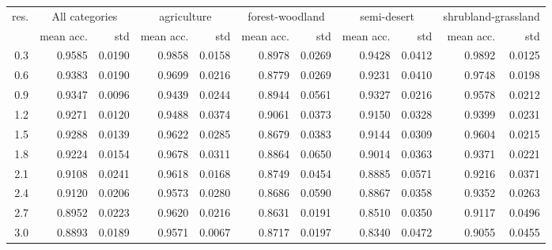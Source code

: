 \begin{tabular}{rrrrrrrrrrr}
\toprule
res. & \multicolumn{2}{c}{All categories} & \multicolumn{2}{c}{agriculture} & \multicolumn{2}{c}{forest-woodland} & \multicolumn{2}{c}{semi-desert} & \multicolumn{2}{c}{shrubland-grassland} \\
           &     mean acc. &    std &                 mean acc. &    std &                     mean acc. &    std &                 mean acc. &    std &                         mean acc. &    std \\
\midrule
       0.3 &   0.9585 & 0.0190 &               0.9858 & 0.0158 &                   0.8978 & 0.0269 &               0.9428 & 0.0412 &                       0.9892 & 0.0125 \\
       0.6 &   0.9383 & 0.0190 &               0.9699 & 0.0216 &                   0.8779 & 0.0269 &               0.9231 & 0.0410 &                       0.9748 & 0.0198 \\
       0.9 &   0.9347 & 0.0096 &               0.9439 & 0.0244 &                   0.8944 & 0.0561 &               0.9327 & 0.0216 &                       0.9578 & 0.0212 \\
       1.2 &   0.9271 & 0.0120 &               0.9488 & 0.0374 &                   0.9061 & 0.0373 &               0.9150 & 0.0328 &                       0.9399 & 0.0231 \\
       1.5 &   0.9288 & 0.0139 &               0.9622 & 0.0285 &                   0.8679 & 0.0383 &               0.9144 & 0.0309 &                       0.9604 & 0.0215 \\
       1.8 &   0.9224 & 0.0154 &               0.9678 & 0.0311 &                   0.8864 & 0.0650 &               0.9014 & 0.0363 &                       0.9371 & 0.0221 \\
       2.1 &   0.9108 & 0.0241 &               0.9618 & 0.0168 &                   0.8749 & 0.0454 &               0.8885 & 0.0571 &                       0.9216 & 0.0371 \\
       2.4 &   0.9120 & 0.0206 &               0.9573 & 0.0280 &                   0.8686 & 0.0590 &               0.8867 & 0.0358 &                       0.9352 & 0.0263 \\
       2.7 &   0.8952 & 0.0223 &               0.9620 & 0.0216 &                   0.8631 & 0.0191 &               0.8510 & 0.0350 &                       0.9117 & 0.0496 \\
       3.0 &   0.8893 & 0.0189 &               0.9571 & 0.0067 &                   0.8717 & 0.0197 &               0.8340 & 0.0472 &                       0.9055 & 0.0455 \\

\end{tabular}
